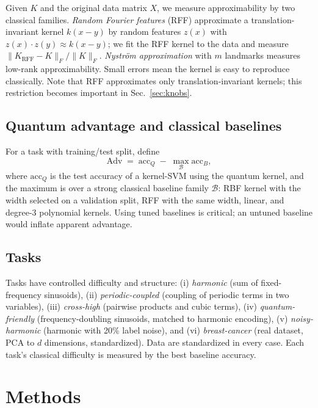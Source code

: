 \documentclass[aps,pra,preprint]{revtex4-2}
\begin{document}
Given $K$ and the original data matrix $X$, we measure approximability by two classical
families. \emph{Random Fourier features} (RFF) \cite{rahimi2007} approximate a
translation-invariant kernel $k(x-y)$ by random features $z(x)$ with
$z(x)\cdot z(y)\approx k(x-y)$; we fit the RFF kernel to the data and measure
$\|K_{\mathrm{RFF}}-K\|_F/\|K\|_F$. \emph{Nystr\"om approximation} with $m$ landmarks
measures low-rank approximability. Small errors mean the kernel is easy to reproduce
classically. Note that RFF approximates only translation-invariant kernels; this
restriction becomes important in Sec.~\ref{sec:knobs}.

\subsection{Quantum advantage and classical baselines}
\label{sec:defs-adv}

For a task with training/test split, define
\begin{equation}
  \mathrm{Adv} \;=\; \mathrm{acc}_Q \;-\; \max_{\mathcal{B}}\mathrm{acc}_B ,
\label{eq:adv}
\end{equation}
where $\mathrm{acc}_Q$ is the test accuracy of a kernel-SVM using the quantum kernel, and
the maximum is over a strong classical baseline family $\mathcal{B}$: RBF kernel with the
width selected on a validation split, RFF with the same width, linear, and degree-3
polynomial kernels. Using tuned baselines is critical; an untuned baseline would inflate
apparent advantage.

\subsection{Tasks}
\label{sec:defs-tasks}

Tasks have controlled difficulty and structure: (i) \emph{harmonic} (sum of
fixed-frequency sinusoids), (ii) \emph{periodic-coupled} (coupling of periodic terms in
two variables), (iii) \emph{cross-high} (pairwise products and cubic terms),
(iv) \emph{quantum-friendly} (frequency-doubling sinusoids, matched to harmonic encoding),
(v) \emph{noisy-harmonic} (harmonic with 20\% label noise), and (vi) \emph{breast-cancer}
(real dataset, PCA to $d$ dimensions, standardized). Data are standardized in every case.
Each task's classical difficulty is measured by the best baseline accuracy.

\section{Methods}
\label{sec:methods}
\end{document}
